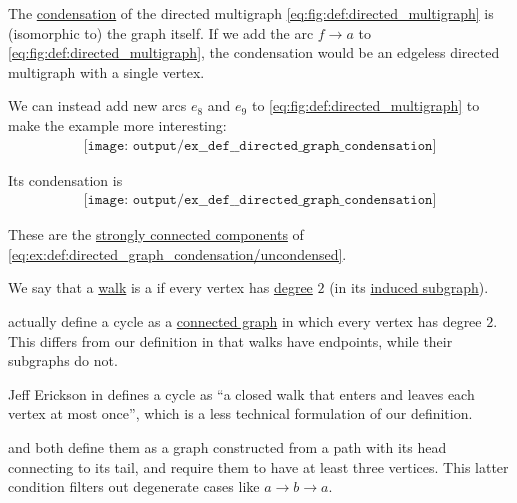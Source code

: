 \begin{example}\label{ex:def:directed_graph_condensation}
  The \hyperref[def:directed_graph_condensation]{condensation} of the directed multigraph \eqref{eq:fig:def:directed_multigraph} is (isomorphic to) the graph itself. If we add the arc \( f \to a \) to \eqref{eq:fig:def:directed_multigraph}, the condensation would be an edgeless directed multigraph with a single vertex.

  We can instead add new arcs \( e_8 \) and \( e_9 \) to \eqref{eq:fig:def:directed_multigraph} to make the example more interesting:
  \begin{equation}\label{eq:ex:def:directed_graph_condensation/uncondensed}
    \begin{aligned}
      \texttt{[image: output/ex\_\_def\_\_directed\_graph\_condensation]}
    \end{aligned}
  \end{equation}

  Its condensation is
  \begin{equation}\label{eq:ex:def:directed_graph_condensation/condensed}
    \begin{aligned}
      \texttt{[image: output/ex\_\_def\_\_directed\_graph\_condensation]}
    \end{aligned}
  \end{equation}

  These are the \hyperref[def:graph_connectedness/strong]{strongly connected components} of \eqref{eq:ex:def:directed_graph_condensation/uncondensed}.
\end{example}

\begin{definition}\label{def:graph_cycle}
  We say that a \hyperref[def:graph_walk]{walk} is a  if every vertex has \hyperref[def:graph_cardinality/directed_degree]{degree} \( 2 \) (in its \hyperref[def:graph_walk/subgraph]{induced subgraph}).
\end{definition}
\begin{comments}
  \item {} actually define a cycle as a \hyperref[def:graph_connectedness]{connected graph} in which every vertex has degree \( 2 \). This differs from our definition in that walks have endpoints, while their subgraphs do not.

  Jeff Erickson in \cite[191]{Erickson2019} defines a cycle as \enquote{a closed walk that enters and leaves each vertex at most once}, which is a less technical formulation of our definition.

   and  both define them as a graph constructed from a path with its head connecting to its tail, and require them to have at least three vertices. This latter condition filters out degenerate cases like \( a \to b \to a \).
\end{comments}

